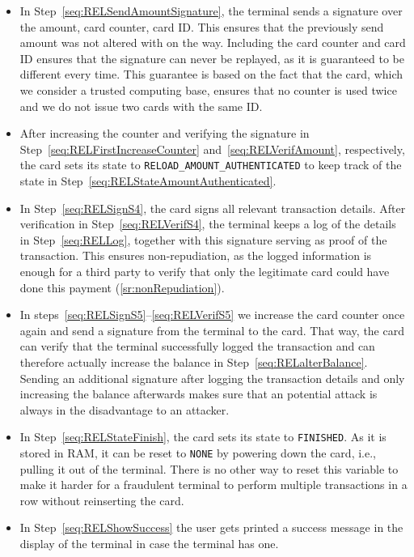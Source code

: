\documentclass{article}
\begin{document}
\begin{itemize}
    \item In Step~\ref{seq:RELSendAmountSignature}, the terminal sends a signature over the amount, card counter, card ID\@.
          This ensures that the previously send amount was not altered with on the way.
          Including the card counter and card ID ensures that the signature can never be replayed, as it is guaranteed to be different every time.
          This guarantee is based on the fact that the card, which we consider a trusted computing base, ensures that no counter is used twice and we do not issue two cards with the same ID\@.

    \item After increasing the counter and verifying the signature in Step~\ref{seq:RELFirstIncreaseCounter} and~\ref{seq:RELVerifAmount}, respectively, the card sets its state to \texttt{RELOAD\_AMOUNT\_AUTHENTICATED} to keep track of the state in Step~\ref{seq:RELStateAmountAuthenticated}.

    \item In Step~\ref{seq:RELSignS4}, the card signs all relevant transaction details.
    After verification in Step~\ref{seq:RELVerifS4}, the terminal keeps a log of the details in Step~\ref{seq:RELLog}, together with this signature serving as proof of the transaction.
    This ensures non-repudiation, as the logged information is enough for a third party to verify that only the legitimate card could have done this payment (\ref{sr:nonRepudiation}).

    \item In steps~\ref{seq:RELSignS5}--\ref{seq:RELVerifS5} we increase the card counter once again and send a signature from the terminal to the card.
          That way, the card can verify that the terminal successfully logged the transaction and can therefore actually increase the balance in Step~\ref{seq:RELalterBalance}.
          Sending an additional signature after logging the transaction details and only increasing the balance afterwards makes sure that an potential attack is always in the disadvantage to an attacker.

    \item In Step~\ref{seq:RELStateFinish}, the card sets its state to \texttt{FINISHED}.
    As it is stored in RAM, it can be reset to \texttt{NONE} by powering down the card, i.e., pulling it out of the terminal.
    There is no other way to reset this variable to make it harder for a fraudulent terminal to perform multiple transactions in a row without reinserting the card.

    \item In Step~\ref{seq:RELShowSuccess} the user gets printed a success message in the display of the terminal in case the terminal has one.
\end{itemize}
\end{document}
